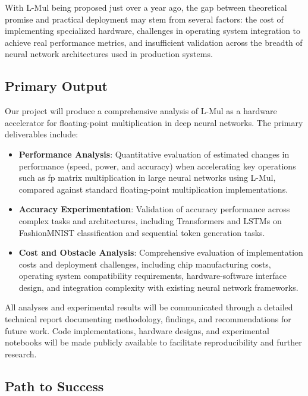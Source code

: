 \documentclass[12pt,letterpaper]{article}
\begin{document}
With L-Mul being proposed just over a year ago, the gap between theoretical promise and practical deployment may stem from several factors: the cost of implementing specialized hardware, challenges in operating system integration to achieve real performance metrics, and insufficient validation across the breadth of neural network architectures used in production systems.

\subsection{Primary Output}

Our project will produce a comprehensive analysis of L-Mul as a hardware accelerator for floating-point multiplication in deep neural networks. The primary deliverables include:

\begin{itemize}
    \item \textbf{Performance Analysis}: Quantitative evaluation of estimated changes in performance (speed, power, and accuracy) when accelerating key operations such as fp matrix multiplication in large neural networks using L-Mul, compared against standard floating-point multiplication implementations.
    
    \item \textbf{Accuracy Experimentation}: Validation of accuracy performance across complex tasks and architectures, including Transformers and LSTMs on FashionMNIST classification and sequential token generation tasks.
    
    \item \textbf{Cost and Obstacle Analysis}: Comprehensive evaluation of implementation costs and deployment challenges, including chip manufacturing costs, operating system compatibility requirements, hardware-software interface design, and integration complexity with existing neural network frameworks.
\end{itemize}
All analyses and experimental results will be communicated through a detailed technical report documenting methodology, findings, and recommendations for future work. Code implementations, hardware designs, and experimental notebooks will be made publicly available to facilitate reproducibility and further research.

\subsection{Path to Success}
\end{document}
